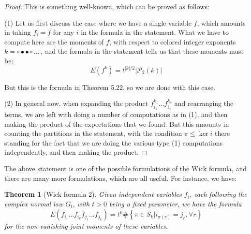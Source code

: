 \documentclass[12pt]{amsbook}
\newtheorem{theorem}{Theorem}[chapter]
\begin{document}
\begin{proof}
This is something well-known, which can be proved as follows:

\medskip

(1) Let us first discuss the case where we have a single variable $f$, which amounts in taking $f_i=f$ for any $i$ in the formula in the statement. What we have to compute here are the moments of $f$, with respect to colored integer exponents $k=\circ\bullet\bullet\circ\ldots\,$, and the formula in the statement tells us that these moments must be:
$$E(f^k)=t^{|k|/2}|\mathcal P_2(k)|$$

But this is the formula in Theorem 5.22, so we are done with this case.

\medskip

(2) In general now, when expanding the product $f_{i_1}^{k_1}\ldots f_{i_s}^{k_s}$ and rearranging the terms, we are left with doing a number of computations as in (1), and then making the product of the expectations that we found. But this amounts in counting the partitions in the statement, with the condition $\pi\leq\ker i$ there standing for the fact that we are doing the various type (1) computations independently, and then making the product.
\end{proof}

The above statement is one of the possible formulations of the Wick formula, and there are many more formulations, which are all useful. For instance, we have:


\begin{theorem}[Wick formula 2]
Given independent variables $f_i$, each following the complex normal law $G_t$, with $t>0$ being a fixed parameter, we have the formula
$$E\left(f_{i_1}\ldots f_{i_k}\bar{f}_{j_1}\ldots\bar{f}_{j_k}\right)=t^k\#\left\{\pi\in S_k\Big|i_{\pi(r)}=j_r,\forall r\right\}$$
for the non-vanishing joint moments of these variables.
\end{theorem}
\end{document}
